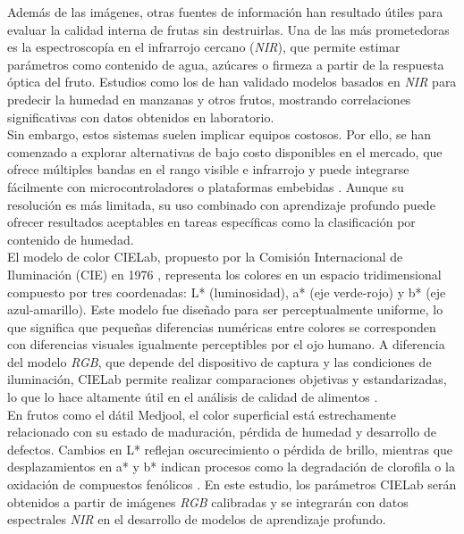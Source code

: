 Además de las imágenes, otras fuentes de información han resultado útiles para evaluar la calidad interna de frutas sin destruirlas. Una de las más prometedoras es la espectroscopía en el infrarrojo cercano (\textit{NIR}), que permite estimar parámetros como contenido de agua, azúcares o firmeza a partir de la respuesta óptica del fruto. Estudios como los de \parencite{chen_prediction_2024, wang_improving_2025} han validado modelos basados en \textit{NIR} para predecir la humedad en manzanas y otros frutos, mostrando correlaciones significativas con datos obtenidos en laboratorio.\\

Sin embargo, estos sistemas suelen implicar equipos costosos. Por ello, se han comenzado a explorar alternativas de bajo costo disponibles en el mercado, que ofrece múltiples bandas en el rango visible e infrarrojo y puede integrarse fácilmente con microcontroladores o plataformas embebidas \parencite{passos_deep_2023}. Aunque su resolución es más limitada, su uso combinado con aprendizaje profundo puede ofrecer resultados aceptables en tareas específicas como la clasificación por contenido de humedad.\\

El modelo de color CIELab, propuesto por la Comisión Internacional de Iluminación (CIE) en 1976 \parencite{ohno_cie_2000}, representa los colores en un espacio tridimensional compuesto por tres coordenadas: L* (luminosidad), a* (eje verde-rojo) y b* (eje azul-amarillo). Este modelo fue diseñado para ser perceptualmente uniforme, lo que significa que pequeñas diferencias numéricas entre colores se corresponden con diferencias visuales igualmente perceptibles por el ojo humano. A diferencia del modelo \textit{RGB}, que depende del dispositivo de captura y las condiciones de iluminación, CIELab permite realizar comparaciones objetivas y estandarizadas, lo que lo hace altamente útil en el análisis de calidad de alimentos \parencite{cen_theory_2007}.\\

En frutos como el dátil Medjool, el color superficial está estrechamente relacionado con su estado de maduración, pérdida de humedad y desarrollo de defectos. Cambios en L* reflejan oscurecimiento o pérdida de brillo, mientras que desplazamientos en a* y b* indican procesos como la degradación de clorofila o la oxidación de compuestos fenólicos \parencite{knott_facilitated_2023}. En este estudio, los parámetros CIELab serán obtenidos a partir de imágenes \textit{RGB} calibradas y se integrarán con datos espectrales \textit{NIR} en el desarrollo de modelos de aprendizaje profundo.\\


